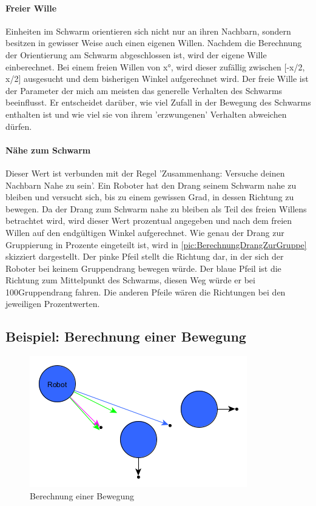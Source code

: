 \paragraph*{Freier Wille} Einheiten im Schwarm orientieren sich nicht nur an ihren Nachbarn, sondern besitzen in gewisser Weise auch einen eigenen Willen. Nachdem die Berechnung der Orientierung am Schwarm abgeschlossen ist, wird der eigene Wille einberechnet. Bei einem freien Willen von x°, wird dieser zufällig zwischen [-x/2, x/2] ausgesucht und dem bisherigen Winkel aufgerechnet wird. Der freie Wille ist der Parameter der mich am meisten das generelle Verhalten des Schwarms beeinflusst. Er entscheidet darüber, wie viel Zufall in der Bewegung des Schwarms enthalten ist und wie viel sie von ihrem 'erzwungenen' Verhalten abweichen dürfen.

\paragraph*{Nähe zum Schwarm} Dieser Wert ist verbunden mit der Regel 'Zusammenhang: Versuche deinen Nachbarn Nahe zu sein'. Ein Roboter hat den Drang seinem Schwarm nahe zu bleiben und versucht sich, bis zu einem gewissen Grad, in dessen Richtung zu bewegen. Da der Drang zum Schwarm nahe zu bleiben als Teil des freien Willens betrachtet wird, wird dieser Wert prozentual angegeben und nach dem freien Willen auf den endgültigen Winkel aufgerechnet. Wie genau der Drang zur Gruppierung in Prozente eingeteilt ist, wird in \autoref{pic:BerechnungDrangZurGruppe} skizziert dargestellt. Der pinke Pfeil stellt die Richtung dar, in der sich der Roboter bei keinem Gruppendrang bewegen würde. Der blaue Pfeil ist die Richtung zum Mittelpunkt des Schwarms, diesen Weg würde er bei 100\per Gruppendrang fahren. Die anderen Pfeile wären die Richtungen bei den jeweiligen Prozentwerten.

\subsection*{Beispiel: Berechnung einer Bewegung}

\begin{figure}
	\includegraphics[width=\pictureWidthBig,keepaspectratio]{graphics/BerechnungBewegung.png}
	\caption{Berechnung einer Bewegung}
	\label{pic:BerechnungBewegung}
\end{figure}

